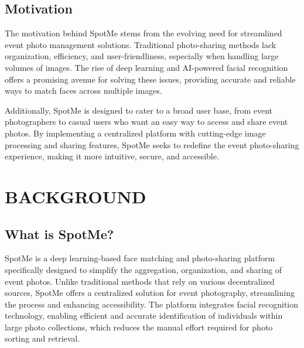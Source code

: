 \documentclass[12pt,a4paper]{report}
\begin{document}
\section{Motivation} The motivation behind SpotMe stems from the evolving need for streamlined event photo management solutions. Traditional photo-sharing methods lack organization, efficiency, and user-friendliness, especially when handling large volumes of images. The rise of deep learning and AI-powered facial recognition offers a promising avenue for solving these issues, providing accurate and reliable ways to match faces across multiple images.

Additionally, SpotMe is designed to cater to a broad user base, from event photographers to casual users who want an easy way to access and share event photos. By implementing a centralized platform with cutting-edge image processing and sharing features, SpotMe seeks to redefine the event photo-sharing experience, making it more intuitive, secure, and accessible.

\chapter{BACKGROUND}

\section{What is SpotMe?}
SpotMe is a deep learning-based face matching and photo-sharing platform specifically designed to simplify the aggregation, organization, and sharing of event photos. Unlike traditional methods that rely on various decentralized sources, SpotMe offers a centralized solution for event photography, streamlining the process and enhancing accessibility. The platform integrates facial recognition technology, enabling efficient and accurate identification of individuals within large photo collections, which reduces the manual effort required for photo sorting and retrieval.
\end{document}
